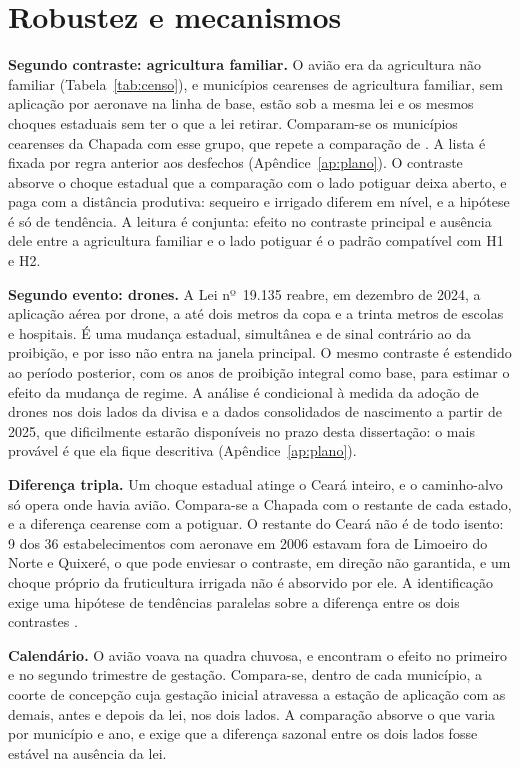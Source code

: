 \section{Robustez e mecanismos}
\label{sec:robustez}

\textbf{Segundo contraste: agricultura familiar.} O avião era da agricultura
não familiar (Tabela~\ref{tab:censo}), e municípios cearenses de agricultura
familiar, sem aplicação por aeronave na linha de base, estão sob a mesma lei e
os mesmos choques estaduais sem ter o que a lei retirar. Comparam-se os
municípios cearenses da Chapada com esse grupo, que repete a comparação de
. A lista é fixada por regra anterior aos
desfechos (Apêndice~\ref{ap:plano}). O contraste absorve o choque estadual que
a comparação com o lado potiguar deixa aberto, e paga com a distância
produtiva: sequeiro e irrigado diferem em nível, e a hipótese é só de
tendência. A leitura é conjunta: efeito no contraste principal e ausência dele
entre a agricultura familiar e o lado potiguar é o padrão compatível com H1 e
H2.

\textbf{Segundo evento: drones.} A Lei nº~19.135 reabre, em dezembro de 2024,
a aplicação aérea por drone, a até dois metros da copa e a trinta metros de
escolas e hospitais. É uma mudança estadual, simultânea e de sinal
contrário ao da proibição, e por isso não entra na janela principal. O mesmo
contraste é estendido ao período posterior, com os anos de proibição integral
como base, para estimar o efeito da mudança de regime. A análise é
condicional à medida da adoção de drones nos dois lados da divisa e a dados
consolidados de nascimento a partir de 2025, que dificilmente estarão
disponíveis no prazo desta dissertação: o mais provável é que ela fique
descritiva (Apêndice~\ref{ap:plano}).

\textbf{Diferença tripla.} Um choque estadual atinge o Ceará inteiro, e o
caminho-alvo só opera onde havia avião. Compara-se a Chapada com o restante de cada estado, e
a diferença cearense com a potiguar. O restante do Ceará não é de todo isento:
9 dos 36 estabelecimentos com aeronave em 2006 estavam fora de Limoeiro do Norte
e Quixeré, o que pode enviesar o contraste, em direção não garantida, e um choque próprio da fruticultura
irrigada não é absorvido por ele. A identificação exige uma hipótese de
tendências paralelas sobre a diferença entre os dois contrastes
\cite{olden2022triple}.

\textbf{Calendário.} O avião voava na quadra chuvosa, e
 encontram o efeito no primeiro e no segundo
trimestre de gestação. Compara-se, dentro de cada município, a coorte de
concepção cuja gestação inicial atravessa a estação de aplicação com as demais,
antes e depois da lei, nos dois lados. A comparação absorve o que varia por
município e ano, e exige que a diferença sazonal entre os dois lados fosse
estável na ausência da lei. 

